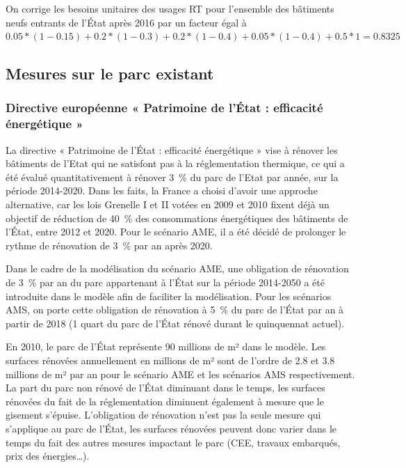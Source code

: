 \documentclass[10.5pt,a4paper]{article}
\begin{document}
{On corrige les besoins unitaires des usages RT pour l’ensemble des bâtiments neufs entrants de l’État après 2016 par un facteur égal à  $0.05*(1-0.15) + 0.2*(1-0.3) + 0.2*(1-0.4) +0.05*(1-0.4) + 0.5*1 = 0.8325$

\subsection{Mesures sur le parc existant}

\subsubsection{Directive européenne « Patrimoine de l’État : efficacité énergétique » }

La directive « Patrimoine de l’État : efficacité énergétique » vise à rénover les bâtiments de l’Etat qui ne satisfont pas à la réglementation thermique, ce qui a été évalué quantitativement à rénover 3~\% du parc de l’Etat par année, sur la période 2014-2020. Dans les faits, la France a choisi d’avoir une approche alternative, car les lois Grenelle I et II votées en 2009 et 2010 fixent déjà un objectif de réduction de 40~\% des consommations énergétiques des bâtiments de l’État, entre 2012 et 2020. Pour le scénario AME, il a été décidé de prolonger le rythme de rénovation de 3~\% par an après 2020.

Dans le cadre de la modélisation du scénario AME, une obligation de rénovation de 3~\% par an du parc appartenant à l’État sur la période 2014-2050 a été introduite dans le modèle afin de faciliter la modélisation. Pour les scénarios AMS, on porte cette obligation de rénovation à 5~\% du parc de l’État par an à partir de 2018 (1 quart du parc de l'État rénové durant le quinquennat actuel).

En 2010, le parc de l’État représente 90 millions de m² dans le modèle. Les surfaces rénovées annuellement en millions de m² sont de l'ordre de 2.8 et 3.8 millions de m² par an  pour le scénario AME et les scénarios AMS respectivement. La part du parc non rénové de l’État diminuant dans le temps, les surfaces rénovées du fait de la réglementation diminuent également à mesure que le gisement s’épuise. L’obligation de rénovation n’est pas la seule mesure qui s’applique au parc de l’État, les surfaces rénovées peuvent donc varier dans le temps du fait des autres mesures impactant le parc (CEE, travaux embarqués, prix des énergies…).


}
\end{document}
